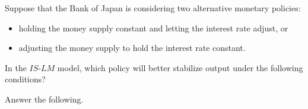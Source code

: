 \documentclass[12pt,a4paper]{exam}
\begin{document}
\begin{questions}
	\question Suppose that the Bank of Japan is considering two alternative monetary policies:
			\begin{itemize}
				\item holding the money supply constant and letting the interest
					rate adjust, or
				\item adjusting the money supply to hold the
					interest rate constant.
			\end{itemize}
			In the $IS$-$LM$ model, which policy will better stabilize output
			under the following conditions?
	\question Answer the following.
			\begin{parts}

\end{parts}
\end{questions}
\end{document}
